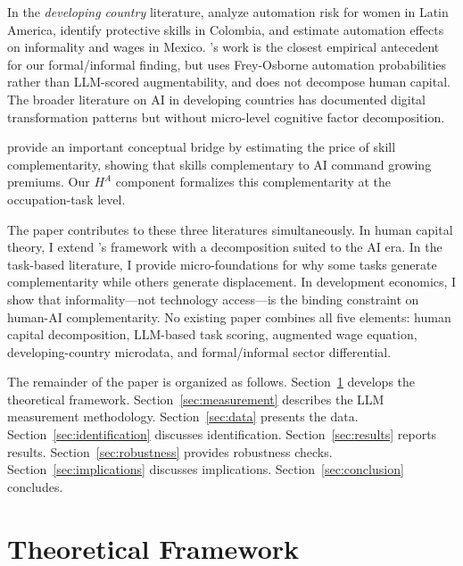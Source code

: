 \documentclass[11pt,a4paper]{article}
\theoremstyle{definition}
\begin{document}
In the \textit{developing country} literature, \citet{eganadelsol2022automation} analyze automation risk for women in Latin America, \citet{jones2022automation} identify protective skills in Colombia, and \citet{mina2025automation} estimate automation effects on informality and wages in Mexico. \citeauthor{mina2025automation}'s work is the closest empirical antecedent for our formal/informal finding, but uses Frey-Osborne automation probabilities rather than LLM-scored augmentability, and does not decompose human capital. The broader literature on AI in developing countries \citep{aly2022digital, eganadelsol2022covid} has documented digital transformation patterns but without micro-level cognitive factor decomposition.

\citet{stephany2024price} provide an important conceptual bridge by estimating the price of skill complementarity, showing that skills complementary to AI command growing premiums. Our $H^A$ component formalizes this complementarity at the occupation-task level.

The paper contributes to these three literatures simultaneously. In human capital theory, I extend \citeauthor{becker1964human}'s framework with a decomposition suited to the AI era. In the task-based literature, I provide micro-foundations for why some tasks generate complementarity while others generate displacement. In development economics, I show that informality---not technology access---is the binding constraint on human-AI complementarity. No existing paper combines all five elements: human capital decomposition, LLM-based task scoring, augmented wage equation, developing-country microdata, and formal/informal sector differential.

The remainder of the paper is organized as follows. Section~\ref{sec:theory} develops the theoretical framework. Section~\ref{sec:measurement} describes the LLM measurement methodology. Section~\ref{sec:data} presents the data. Section~\ref{sec:identification} discusses identification. Section~\ref{sec:results} reports results. Section~\ref{sec:robustness} provides robustness checks. Section~\ref{sec:implications} discusses implications. Section~\ref{sec:conclusion} concludes.


\section{Theoretical Framework}
\label{sec:theory}
\end{document}
